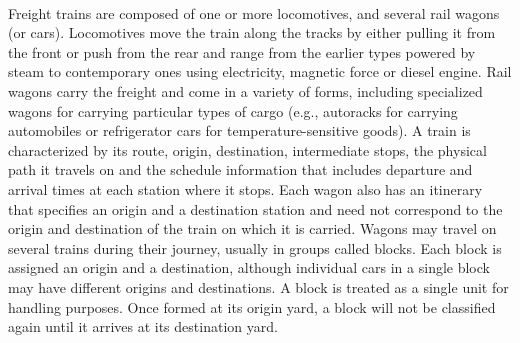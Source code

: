 \paragraph{}
Freight trains are composed of one or more locomotives, and several rail
wagons (or cars). Locomotives move the train along the tracks by either pulling it from the front or push from the rear and range from the earlier types powered by steam to contemporary ones using electricity, magnetic force or diesel engine. Rail wagons carry the freight and come in a variety of forms, including specialized wagons for carrying particular types of cargo (e.g., autoracks for carrying automobiles or refrigerator cars for temperature-sensitive goods). A train is characterized by its route, origin, destination, intermediate stops, the physical path it travels on and the schedule information that includes departure and arrival times at each station where it stops. Each wagon also has an itinerary that specifies an origin and a destination station and need not correspond to the origin and destination of the train on which it is carried. Wagons may travel on several trains during their journey, usually in groups called blocks. Each block is assigned an origin and a destination, although individual cars in a single block may have different origins and destinations. A block is treated as a single unit for handling purposes. Once formed at its origin yard, a block will not be classified again until it arrives at its destination yard.
